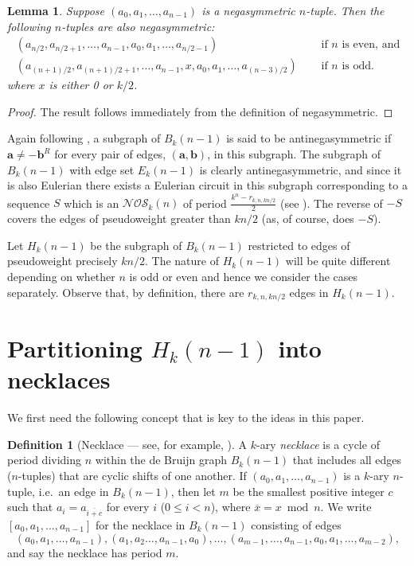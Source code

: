 \documentclass[a4paper,11pt]{article}
\theoremstyle{plain}
\newtheorem{lemma}{Lemma}[section]
\theoremstyle{definition}
\newtheorem{definition}{Definition}[section]
\theoremstyle{remark}
\begin{document}
\begin{lemma}  \label{lemma:nega_moved_by_halfn_is_nega}
Suppose $(a_0,a_1,\dots,a_{n-1})$ is a negasymmetric $n$-tuple.  Then the following $n$-tuples are
also negasymmetric:
\[
\begin{split}
(a_{n/2},a_{n/2+1},\dots,a_{n-1},a_0,a_1,\dots,a_{n/2-1}) & \text{~~~~if $n$ is even, and} \\
(a_{(n+1)/2},a_{(n+1)/2+1},\dots,a_{n-1},x,a_0,a_1,\dots,a_{(n-3)/2}) & \text{~~~~if $n$ is odd.}
\end{split}
\]
where $x$ is either 0 or $k/2$.
\end{lemma}

\begin{proof}
The result follows immediately from the definition of negasymmetric.
\end{proof}


Again following \cite{Mitchell26}, a subgraph of $B_k(n-1)$ is said to be antinegasymmetric if
$\mathbf{a}\neq-\mathbf{b}^R$ for every pair of edges, $(\mathbf{a},\mathbf{b})$, in this subgraph.
The subgraph of $B_k(n-1)$ with edge set $E_k(n-1)$ is clearly antinegasymmetric, and since it is
also Eulerian there exists a Eulerian circuit in this subgraph corresponding to a sequence $S$
which is an $\mathcal{NOS}_k(n)$ of period $\frac{k^n-r_{k,n,kn/2}}{2}$ (see \cite[Lemma
3.15]{Mitchell25a}). The reverse of $-S$ covers the edges of pseudoweight greater than $kn/2$ (as,
of course, does $-S$).

Let $H_k(n-1)$ be the subgraph of $B_k(n-1)$ restricted to edges of pseudoweight precisely $kn/2$.
The nature of $H_k(n-1)$ will be quite different depending on whether
$n$ is odd or even and hence we consider the cases
separately. Observe that, by definition, there
are $r_{k,n,kn/2}$ edges in $H_k(n-1)$.

\section{Partitioning \texorpdfstring{$H_k(n-1)$}{Hk(n-1)} into necklaces}  \label{section:circuit_partition}

We first need the following concept that is key to the ideas in this paper.

\begin{definition}[Necklace --- see, for example, \cite{Ruskey92}]
A $k$-ary \emph{necklace} is a cycle of period dividing $n$ within the de Bruijn graph $B_k(n-1)$
that includes all edges ($n$-tuples) that are cyclic shifts of one another.  If
$(a_0,a_1,\dots,a_{n-1})$ is a $k$-ary $n$-tuple, i.e.\ an edge in $B_k(n-1)$, then let $m$ be the
smallest positive integer $c$ such that $a_i=a_{\overline{i+c}}$ for every $i$ ($0\leq i<n$), where
$\overline{x}=x\bmod n$. We write $[a_0,a_1,\dots,a_{n-1}]$ for the necklace in $B_k(n-1)$
consisting of edges
\[ (a_0,a_1,\dots,a_{n-1}), (a_1,a_2\dots,a_{n-1},a_0), \dots,
(a_{m-1},\dots,a_{n-1},a_0,a_1,\dots,a_{m-2}), \] and say the necklace has period $m$.
\end{definition}
\end{document}
